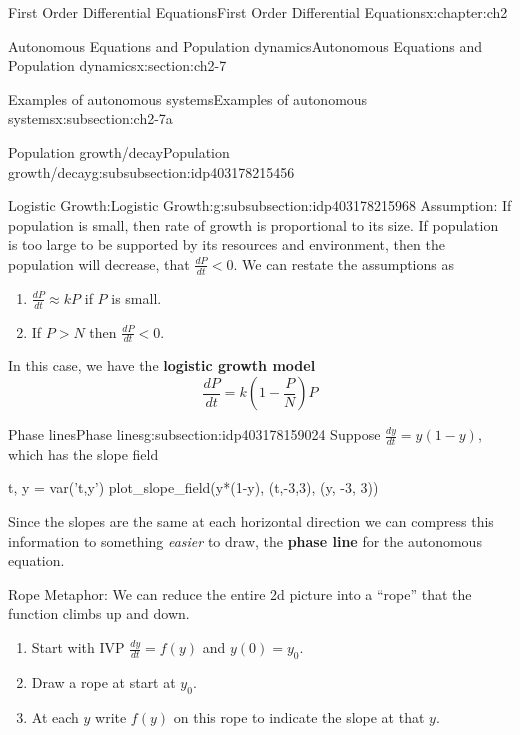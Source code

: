 \documentclass[oneside,10pt,]{book}
\newcommand{\terminology}[1]{\textbf{#1}}
\numberwithin{equation}{section}
\numberwithin{equation}{section}
\newcommand{\lt}{<}
\begin{document}
\begin{chapterptx}{First Order Differential Equations}{}{First Order Differential Equations}{}{}{x:chapter:ch2}
\begin{sectionptx}{Autonomous Equations and Population dynamics}{}{Autonomous Equations and Population dynamics}{}{}{x:section:ch2-7}
\begin{subsectionptx}{Examples of autonomous systems}{}{Examples of autonomous systems}{}{}{x:subsection:ch2-7a}
\begin{subsubsectionptx}{Population growth\slash{}decay}{}{Population growth\slash{}decay}{}{}{g:subsubsection:idp403178215456}
\end{subsubsectionptx}
%
%
\typeout{************************************************}
\typeout{************************************************}
%
\begin{subsubsectionptx}{Logistic Growth:}{}{Logistic Growth:}{}{}{g:subsubsection:idp403178215968}
Assumption: If population is small, then rate of growth is proportional to its size. If population is too large to be supported by its resources and environment, then the population will decrease, that \(\frac{dP}{dt} \lt 0\). We can restate the assumptions as%
\begin{enumerate}
\item{}\(\frac{dP}{dt}\approx kP\) if \(P\) is small.%
\item{}If \(P>N\) then \(\frac{dP}{dt} \lt 0\).%
\end{enumerate}
%
\par
In this case, we have the \terminology{logistic growth model}%
\begin{equation*}
\frac{dP}{dt}=k\left(1-\frac{P}{N}\right)P
\end{equation*}
%
\end{subsubsectionptx}
\end{subsectionptx}
%
%
\typeout{************************************************}
\typeout{************************************************}
%
\begin{subsectionptx}{Phase lines}{}{Phase lines}{}{}{g:subsection:idp403178159024}
Suppose \(\frac{dy}{dt}=y(1-y)\), which has the slope field \begin{sageinput}
t, y = var('t,y')
plot_slope_field(y*(1-y), (t,-3,3), (y, -3, 3))
\end{sageinput}
%
\par
Since the slopes are the same at each horizontal direction we can compress this information to something \emph{easier} to draw, the \terminology{phase line} for the autonomous equation.%
\par
Rope Metaphor: We can reduce the entire 2d picture into a ``rope'' that the function climbs up and down.%
\begin{enumerate}
\item{}Start with IVP \(\frac{dy}{dt}=f(y)\) and \(y(0)=y_{0}\).%
\item{}Draw a rope at start at \(y_{0}\).%
\item{}At each \(y\) write \(f(y)\) on this rope to indicate the slope at that \(y\).%

\end{enumerate}
\end{subsectionptx}
\end{sectionptx}
\end{chapterptx}
\end{document}
